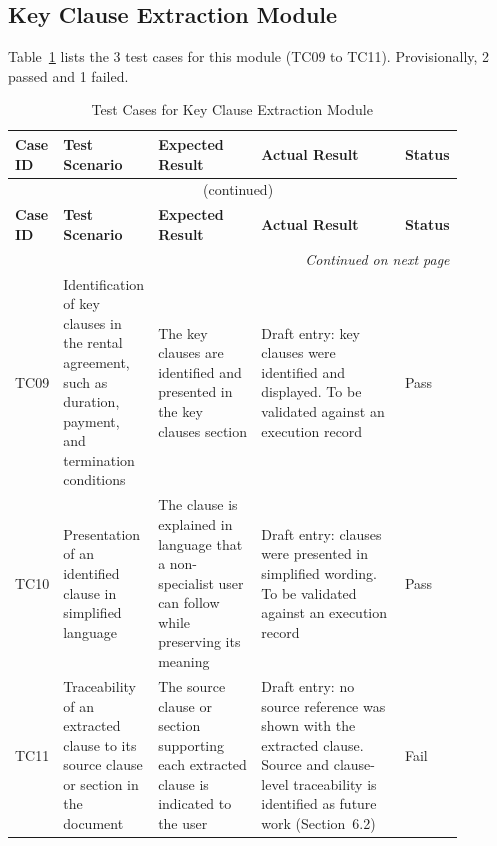 \documentclass[12pt,a4paper,oneside]{report}
\begin{document}
\subsection{Key Clause Extraction Module}
Table~\ref{tab:clause} lists the 3 test cases for this module (TC09 to TC11). Provisionally, 2 passed and 1 failed.
{\footnotesize
\setlength{\tabcolsep}{3pt}
\renewcommand{\arraystretch}{1.15}
\begin{longtable}{|p{0.075\linewidth}|p{0.19\linewidth}|p{0.23\linewidth}|p{0.32\linewidth}|p{0.08\linewidth}|}
\caption{Test Cases for Key Clause Extraction Module}\label{tab:clause}\\
\hline
\textbf{Case ID} & \textbf{Test Scenario} & \textbf{Expected Result} & \textbf{Actual Result} & \textbf{Status}\\
\hline
\endfirsthead
\multicolumn{5}{c}{\tablename~\thetable{} (continued)}\\
\hline
\textbf{Case ID} & \textbf{Test Scenario} & \textbf{Expected Result} & \textbf{Actual Result} & \textbf{Status}\\
\hline
\endhead
\hline
\multicolumn{5}{r}{\emph{Continued on next page}}\\
\endfoot
\hline
\endlastfoot
TC09 & Identification of key clauses in the rental agreement, such as duration, payment, and termination conditions & The key clauses are identified and presented in the key clauses section & Draft entry: key clauses were identified and displayed. To be validated against an execution record & Pass\\
\hline
TC10 & Presentation of an identified clause in simplified language & The clause is explained in language that a non-specialist user can follow while preserving its meaning & Draft entry: clauses were presented in simplified wording. To be validated against an execution record & Pass\\
\hline
TC11 & Traceability of an extracted clause to its source clause or section in the document & The source clause or section supporting each extracted clause is indicated to the user & Draft entry: no source reference was shown with the extracted clause. Source and clause-level traceability is identified as future work (Section~6.2) & Fail\\
\end{longtable}
}
\end{document}
